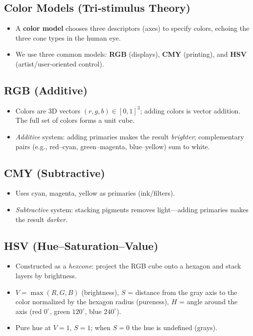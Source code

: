 \documentclass[8pt,twocolumn]{extarticle}
\begin{document}
\subsection*{Color Models (Tri‐stimulus Theory)}
\begin{itemize}
  \item A \textbf{color model} chooses three descriptors (axes) to specify colors, echoing the three cone types in the human eye.
  \item We use three common models: \textbf{RGB} (displays), \textbf{CMY} (printing), and \textbf{HSV} (artist/user‐oriented control).
\end{itemize}

\subsection*{RGB (Additive)}
\begin{itemize}
  \item Colors are 3D vectors $(r,g,b)\in[0,1]^3$; adding colors is vector addition. The full set of colors forms a unit cube.
  \item \emph{Additive} system: adding primaries makes the result \emph{brighter}; complementary pairs (e.g., red–cyan, green–magenta, blue–yellow) sum to white.
\end{itemize}

\subsection*{CMY (Subtractive)}
\begin{itemize}
  \item Uses cyan, magenta, yellow as primaries (ink/filters).
  \item \emph{Subtractive} system: stacking pigments removes light—adding primaries makes the result \emph{darker}.
\end{itemize}

\subsection*{HSV (Hue–Saturation–Value)}
\begin{itemize}
  \item Constructed as a \emph{hexcone}: project the RGB cube onto a hexagon and stack layers by brightness.
  \item $V=\max(R,G,B)$ (brightness), \; $S$ = distance from the gray axis to the color normalized by the hexagon radius (pureness), \; $H$ = angle around the axis (red $0^\circ$, green $120^\circ$, blue $240^\circ$).
  \item Pure hue at $V=1,\,S=1$; when $S=0$ the hue is undefined (grays).
\end{itemize}
\end{document}
